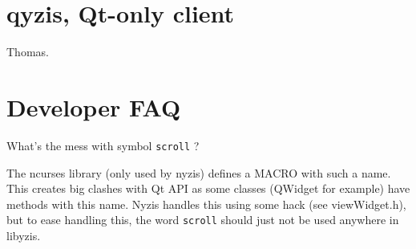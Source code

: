 \documentclass[a4paper,12pt]{report}
\begin{document}
\chapter{qyzis, Qt-only client}

Thomas.

\chapter{Developer FAQ}

What's the mess with symbol \verb+scroll+ ?

The ncurses library (only used by nyzis) defines a MACRO with such a name.
This creates big clashes with Qt API as some classes (QWidget for example)
have methods with this name. Nyzis handles this using some hack (see
viewWidget.h), but to ease handling this, the word \verb+scroll+ should
just not be used anywhere in libyzis.
\end{document}
